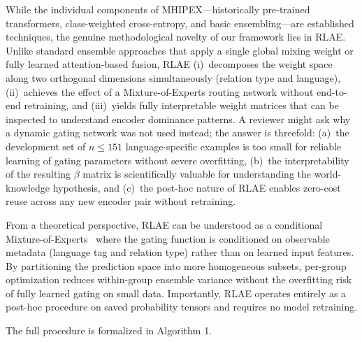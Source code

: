 \documentclass[11pt,a4paper]{article}
\begin{document}
While the individual components of MHIPEX---historically pre-trained transformers, class-weighted cross-entropy, and basic ensembling---are established techniques, the genuine methodological novelty of our framework lies in RLAE. Unlike standard ensemble approaches that apply a single global mixing weight or fully learned attention-based fusion, RLAE (i)~decomposes the weight space along two orthogonal dimensions simultaneously (relation type and language), (ii)~achieves the effect of a Mixture-of-Experts routing network without end-to-end retraining, and (iii)~yields fully interpretable weight matrices that can be inspected to understand encoder dominance patterns. A reviewer might ask why a dynamic gating network was not used instead; the answer is threefold: (a)~the development set of $n\leq 151$ language-specific examples is too small for reliable learning of gating parameters without severe overfitting, (b)~the interpretability of the resulting $\beta$ matrix is scientifically valuable for understanding the world-knowledge hypothesis, and (c)~the post-hoc nature of RLAE enables zero-cost reuse across any new encoder pair without retraining.

From a theoretical perspective, RLAE can be understood as a conditional Mixture-of-Experts~\cite{garmash2016} where the gating function is conditioned on observable metadata (language tag and relation type) rather than on learned input features. By partitioning the prediction space into more homogeneous subsets, per-group optimization reduces within-group ensemble variance without the overfitting risk of fully learned gating on small data. Importantly, RLAE operates entirely as a post-hoc procedure on saved probability tensors and requires no model retraining.

The full procedure is formalized in Algorithm 1.
\end{document}
